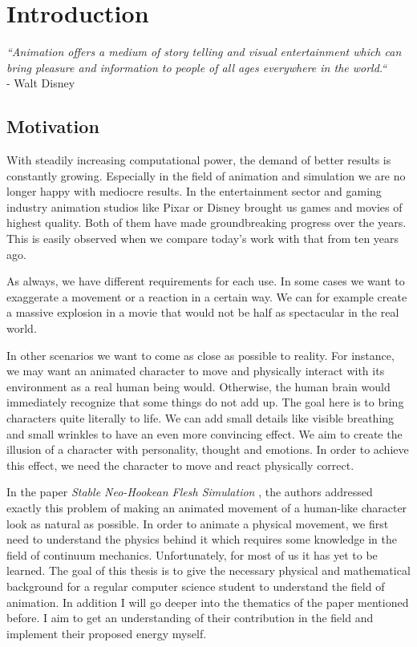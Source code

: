 \chapter{Introduction}
\textit{``Animation offers a medium of story telling and visual entertainment which can bring pleasure and information to people of all ages everywhere in the world.``} \\
- Walt Disney


\section{Motivation}
With steadily increasing computational power, the demand of better results is constantly growing. Especially in the field of animation and simulation we are no longer happy with mediocre results. 
In the entertainment sector and gaming industry animation studios like Pixar\textsuperscript{\textcopyright} or Disney\textsuperscript{\textcopyright} brought us games and movies of highest quality. Both of them have made groundbreaking progress over the years. This is easily observed when we compare today's work with that from ten years ago. 

As always, we have different requirements for each use.
In some cases we want to exaggerate a movement or a reaction in a certain way. We can for example create a massive explosion in a movie that would not be half as spectacular in the real world. 

In other scenarios we want to come as close as possible to reality. For instance, we may want an animated character to move and physically interact with its environment as a real human being would. Otherwise, the human brain would immediately recognize that some things do not add up.
The goal here is to bring characters quite literally to life. We can add small details like visible breathing and small wrinkles to have an even more convincing effect. We aim to create the illusion of a character with personality, thought and emotions. In order to achieve this effect, we need the character to move and react physically correct. 

In the paper \textit{Stable Neo-Hookean Flesh Simulation} \cite{Smith:2018:SNF:3191713.3180491}, the authors addressed exactly this problem of making an animated movement of a human-like character look as natural as possible. In order to animate a physical movement, we first need to understand the physics behind it which requires some knowledge in the field of continuum mechanics. Unfortunately, for most of us it has yet to be learned. The goal of this thesis is to give the necessary physical and mathematical background for a regular computer science student to understand the field of animation. In addition I will go deeper into the thematics of the paper mentioned before. I aim to get an understanding of their contribution in the field and implement their proposed energy myself.


